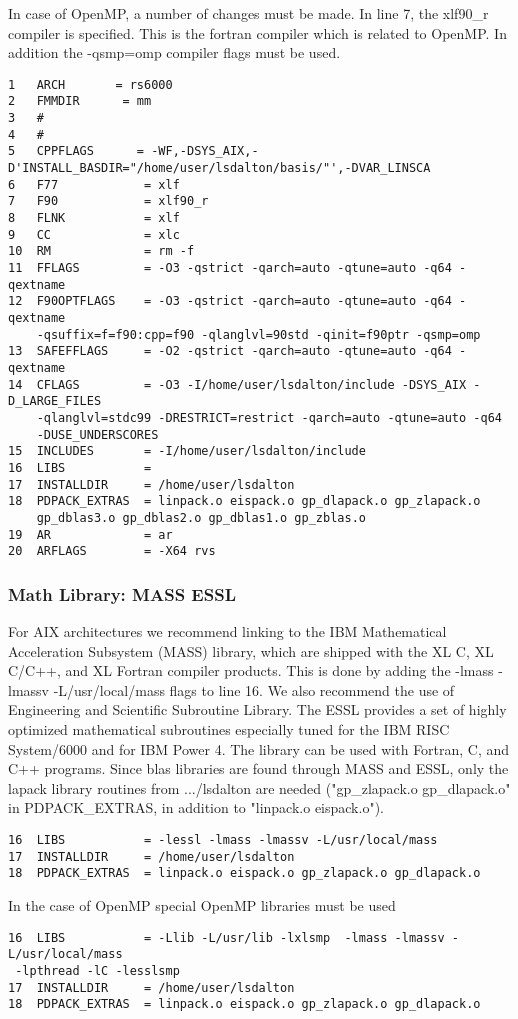 In case of OpenMP, a number of changes must be made. In line 7, the xlf90\_r compiler is specified. This is the fortran compiler which is related to OpenMP. In addition the -qsmp=omp compiler flags must be used. 
\begin{verbatim}
1   ARCH       = rs6000
2   FMMDIR      = mm
3   #
4   #
5   CPPFLAGS      = -WF,-DSYS_AIX,-D'INSTALL_BASDIR="/home/user/lsdalton/basis/"',-DVAR_LINSCA 
6   F77            = xlf
7   F90            = xlf90_r
8   FLNK           = xlf
9   CC             = xlc
10  RM             = rm -f
11  FFLAGS         = -O3 -qstrict -qarch=auto -qtune=auto -q64 -qextname
12  F90OPTFLAGS    = -O3 -qstrict -qarch=auto -qtune=auto -q64 -qextname 
    -qsuffix=f=f90:cpp=f90 -qlanglvl=90std -qinit=f90ptr -qsmp=omp
13  SAFEFFLAGS     = -O2 -qstrict -qarch=auto -qtune=auto -q64 -qextname
14  CFLAGS         = -O3 -I/home/user/lsdalton/include -DSYS_AIX -D_LARGE_FILES
    -qlanglvl=stdc99 -DRESTRICT=restrict -qarch=auto -qtune=auto -q64 
    -DUSE_UNDERSCORES 
15  INCLUDES       = -I/home/user/lsdalton/include 
16  LIBS           = 
17  INSTALLDIR     = /home/user/lsdalton
18  PDPACK_EXTRAS  = linpack.o eispack.o gp_dlapack.o gp_zlapack.o 
    gp_dblas3.o gp_dblas2.o gp_dblas1.o gp_zblas.o
19  AR             = ar
20  ARFLAGS        = -X64 rvs
\end{verbatim}

\subsubsection{Math Library: MASS ESSL}

For AIX architectures we recommend linking to the 
IBM Mathematical Acceleration Subsystem (MASS) library, 
which are shipped with the XL C, XL C/C++, and XL Fortran 
compiler products. This is done by adding the -lmass 
-lmassv -L/usr/local/mass flags to line 16. We also recommend 
the use of Engineering and Scientific Subroutine Library. The 
ESSL provides a set of highly optimized mathematical subroutines 
especially tuned for the IBM RISC System/6000 and for IBM Power 4. 
The library can be used with Fortran, C, and C++ programs. Since 
blas libraries are found through MASS and ESSL, only the lapack 
library routines from .../lsdalton are needed ("gp\_zlapack.o 
gp\_dlapack.o" in PDPACK\_EXTRAS, in addition to "linpack.o eispack.o").
\begin{verbatim}
16  LIBS           = -lessl -lmass -lmassv -L/usr/local/mass
17  INSTALLDIR     = /home/user/lsdalton
18  PDPACK_EXTRAS  = linpack.o eispack.o gp_zlapack.o gp_dlapack.o
\end{verbatim}
In the case of OpenMP special OpenMP libraries must be used
\begin{verbatim}
16  LIBS           = -Llib -L/usr/lib -lxlsmp  -lmass -lmassv -L/usr/local/mass
 -lpthread -lC -lesslsmp
17  INSTALLDIR     = /home/user/lsdalton
18  PDPACK_EXTRAS  = linpack.o eispack.o gp_zlapack.o gp_dlapack.o
\end{verbatim}

